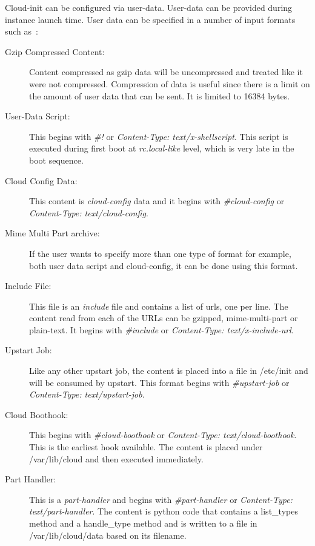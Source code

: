 Cloud-init can be configured via user-data. User-data can be provided during
instance launch time. User data can be specified in a number of input formats
such as~\cite{hid-sp18-516-www-cloud-init}:

\begin{description}
   \item[Gzip Compressed Content:] Content compressed as gzip data will be
   uncompressed and treated like it were not compressed. Compression of data 
   is useful since there is a limit on the amount of user data that can be 
   sent. It is limited to 16384 bytes. 
   \item[User-Data Script:] This begins with \textit{\#!} or
   \textit{Content-Type: text/x-shellscript}. This script is executed during 
   first boot at \textit{rc.local-like} level, which is very late in the boot 
   sequence. 
   \item[Cloud Config Data:] This content is \textit{cloud-config} data and it
   begins with \textit{\#cloud-config} or 
   \textit{Content-Type: text/cloud-config}. 
   \item[Mime Multi Part archive:] If the user wants to specify more than one
   type of format for example, both user data script and cloud-config, it can 
   be done using this format. 
   \item[Include File:] This file is an \textit{include} file and contains a
   list of urls, one per line. The content read from each of the URLs can be
   gzipped, mime-multi-part or plain-text. It begins with \textit{\#include} or
   \textit{Content-Type: text/x-include-url}. 
   \item[Upstart Job:] Like any other upstart job, the content is placed into a
   file in /etc/init and will be consumed by upstart. This format begins with
   \textit{\#upstart-job} or \textit{Content-Type: text/upstart-job}. 
   \item[Cloud Boothook:] This begins with \textit{\#cloud-boothook} or
   \textit{Content-Type: text/cloud-boothook}. This is the earliest hook 
   available. The content is placed under /var/lib/cloud and then executed 
   immediately. 
   \item[Part Handler:] This is a \textit{part-handler} and begins with
   \textit{\#part-handler} or \textit{Content-Type: text/part-handler}. The 
   content is python code that contains a list\_types method and a 
   handle\_type method and is written to a file in /var/lib/cloud/data 
   based on its filename. 
\end{description}

